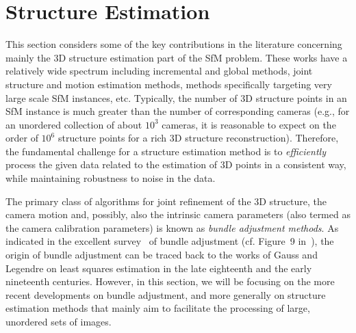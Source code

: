 \documentclass[10pt]{article}
\begin{document}
\section{Structure Estimation}
\label{sec:StructEst}
This section considers some of the key contributions in the literature concerning mainly the $3$D structure estimation part of the SfM problem. These works have a relatively wide spectrum including incremental and global methods, joint structure and motion estimation methods, methods specifically targeting very large scale SfM instances, etc. Typically, the number of $3$D structure points in an SfM instance is much greater than the number of corresponding cameras (e.g., for an unordered collection of about $10^3$ cameras, it is reasonable to expect on the order of $10^6$ structure points for a rich $3$D structure reconstruction). Therefore, the fundamental challenge for a structure estimation method is to \textit{efficiently} process the given data related to the estimation of $3$D points in a consistent way, while maintaining robustness to noise in the data.  

The primary class of algorithms for joint refinement of the $3$D structure, the camera motion and, possibly, also the intrinsic camera parameters (also termed as the camera calibration parameters) is known as \textit{bundle adjustment methods}. As indicated in the excellent survey~\cite{BundleAdjustment} of bundle adjustment (cf. Figure~9 in~\cite{BundleAdjustment}), the origin of bundle adjustment can be traced back to the works of Gauss and Legendre on least squares estimation in the late eighteenth and the early nineteenth centuries. However, in this section, we will be focusing on the more recent developments on bundle adjustment, and more generally on structure estimation methods that mainly aim to facilitate the processing of large, unordered sets of images.
\end{document}
